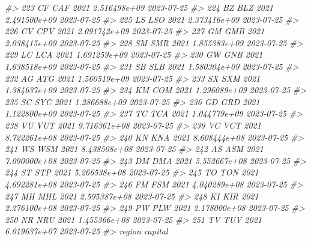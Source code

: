 \documentclass[
  xelatex, ja=standard]{bxjsbook}
\newenvironment{Shaded}{\begin{snugshade}}{\end{snugshade}}
\newcommand{\CommentTok}[1]{\textcolor[rgb]{0.56,0.35,0.01}{\textit{#1}}}
\theoremstyle{definition}
\theoremstyle{definition}
\theoremstyle{definition}
\theoremstyle{definition}
\theoremstyle{remark}
\begin{document}
\begin{Shaded}
\begin{Highlighting}[]
\CommentTok{\#\textgreater{} 223    CF   CAF 2021 2.516498e+09         2023{-}07{-}25}
\CommentTok{\#\textgreater{} 224    BZ   BLZ 2021 2.491500e+09         2023{-}07{-}25}
\CommentTok{\#\textgreater{} 225    LS   LSO 2021 2.373416e+09         2023{-}07{-}25}
\CommentTok{\#\textgreater{} 226    CV   CPV 2021 2.091742e+09         2023{-}07{-}25}
\CommentTok{\#\textgreater{} 227    GM   GMB 2021 2.038415e+09         2023{-}07{-}25}
\CommentTok{\#\textgreater{} 228    SM   SMR 2021 1.855383e+09         2023{-}07{-}25}
\CommentTok{\#\textgreater{} 229    LC   LCA 2021 1.691259e+09         2023{-}07{-}25}
\CommentTok{\#\textgreater{} 230    GW   GNB 2021 1.638518e+09         2023{-}07{-}25}
\CommentTok{\#\textgreater{} 231    SB   SLB 2021 1.580304e+09         2023{-}07{-}25}
\CommentTok{\#\textgreater{} 232    AG   ATG 2021 1.560519e+09         2023{-}07{-}25}
\CommentTok{\#\textgreater{} 233    SX   SXM 2021 1.384637e+09         2023{-}07{-}25}
\CommentTok{\#\textgreater{} 234    KM   COM 2021 1.296089e+09         2023{-}07{-}25}
\CommentTok{\#\textgreater{} 235    SC   SYC 2021 1.286688e+09         2023{-}07{-}25}
\CommentTok{\#\textgreater{} 236    GD   GRD 2021 1.122800e+09         2023{-}07{-}25}
\CommentTok{\#\textgreater{} 237    TC   TCA 2021 1.044779e+09         2023{-}07{-}25}
\CommentTok{\#\textgreater{} 238    VU   VUT 2021 9.716361e+08         2023{-}07{-}25}
\CommentTok{\#\textgreater{} 239    VC   VCT 2021 8.722261e+08         2023{-}07{-}25}
\CommentTok{\#\textgreater{} 240    KN   KNA 2021 8.608444e+08         2023{-}07{-}25}
\CommentTok{\#\textgreater{} 241    WS   WSM 2021 8.438508e+08         2023{-}07{-}25}
\CommentTok{\#\textgreater{} 242    AS   ASM 2021 7.090000e+08         2023{-}07{-}25}
\CommentTok{\#\textgreater{} 243    DM   DMA 2021 5.552667e+08         2023{-}07{-}25}
\CommentTok{\#\textgreater{} 244    ST   STP 2021 5.266538e+08         2023{-}07{-}25}
\CommentTok{\#\textgreater{} 245    TO   TON 2021 4.692281e+08         2023{-}07{-}25}
\CommentTok{\#\textgreater{} 246    FM   FSM 2021 4.040289e+08         2023{-}07{-}25}
\CommentTok{\#\textgreater{} 247    MH   MHL 2021 2.595387e+08         2023{-}07{-}25}
\CommentTok{\#\textgreater{} 248    KI   KIR 2021 2.276100e+08         2023{-}07{-}25}
\CommentTok{\#\textgreater{} 249    PW   PLW 2021 2.178000e+08         2023{-}07{-}25}
\CommentTok{\#\textgreater{} 250    NR   NRU 2021 1.455366e+08         2023{-}07{-}25}
\CommentTok{\#\textgreater{} 251    TV   TUV 2021 6.019637e+07         2023{-}07{-}25}
\CommentTok{\#\textgreater{}                         region             capital}

\end{Highlighting}
\end{Shaded}
\end{document}
